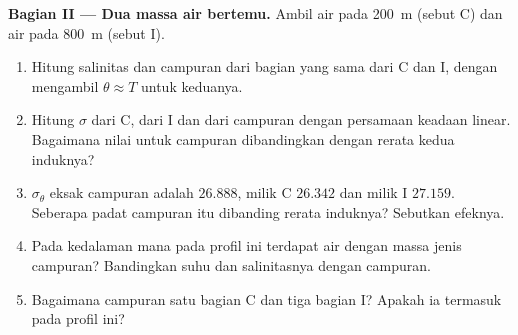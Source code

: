 \begin{problem}
\medskip
\noindent\textbf{Bagian II --- Dua massa air bertemu.} Ambil air pada \qty{200}{m}
(sebut C) dan air pada \qty{800}{m} (sebut I).
\begin{enumerate}[resume]
  \item Hitung salinitas dan  campuran dari bagian yang sama dari C dan
        I, dengan mengambil $\theta \approx T$ untuk keduanya.
  \item Hitung $\sigma$ dari C, dari I dan dari campuran dengan persamaan keadaan
        linear. Bagaimana nilai untuk campuran dibandingkan dengan rerata kedua
        induknya?
  \item $\sigma_\theta$ eksak campuran adalah $26.888$, milik C $26.342$ dan milik I
        $27.159$. Seberapa padat campuran itu dibanding rerata induknya? Sebutkan
        efeknya.
  \item Pada kedalaman mana pada profil ini terdapat air dengan massa jenis campuran?
        Bandingkan suhu dan salinitasnya dengan campuran.
  \item Bagaimana campuran satu bagian C dan tiga bagian I? Apakah ia termasuk pada profil ini?
\end{enumerate}


\end{problem}
